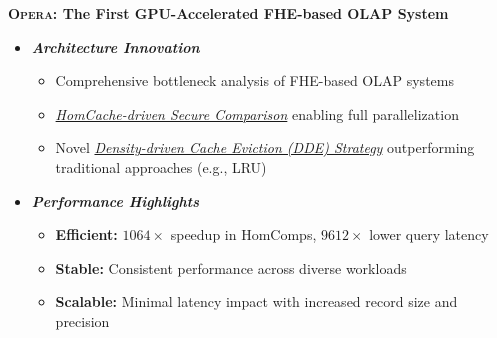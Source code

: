 \documentclass[portrait,a1paper,fontscale=0.42]{baposter}
\newcommand{\Sys}{\textsc{Opera}\xspace}
\begin{document}
\begin{poster}
{    \textcolor{orange}{\faLightbulb} \; \textbf{\Sys: The First GPU-Accelerated FHE-based OLAP System}
    \vspace{1em}
    \begin{itemize}
        \item \textbf{\textit{Architecture Innovation}}
        \begin{itemize}
            \item Comprehensive bottleneck analysis of FHE-based OLAP systems
            \item \underline{\textit{HomCache-driven Secure Comparison}} enabling full parallelization
            \item Novel \underline{\textit{Density-driven Cache Eviction (DDE) Strategy}} outperforming traditional approaches (e.g., LRU)
        \end{itemize}
        \vspace{0.5em}
        \item \textbf{\textit{Performance Highlights}}
        \begin{itemize}
            \item \textbf{Efficient:} $1064\times$ speedup in HomComps, $9612\times$ lower query latency
            \item \textbf{Stable:} Consistent performance across diverse workloads
            \item \textbf{Scalable:} Minimal latency impact with increased record size and precision
        \end{itemize}
    \end{itemize}
}


\end{poster}
\end{document}
